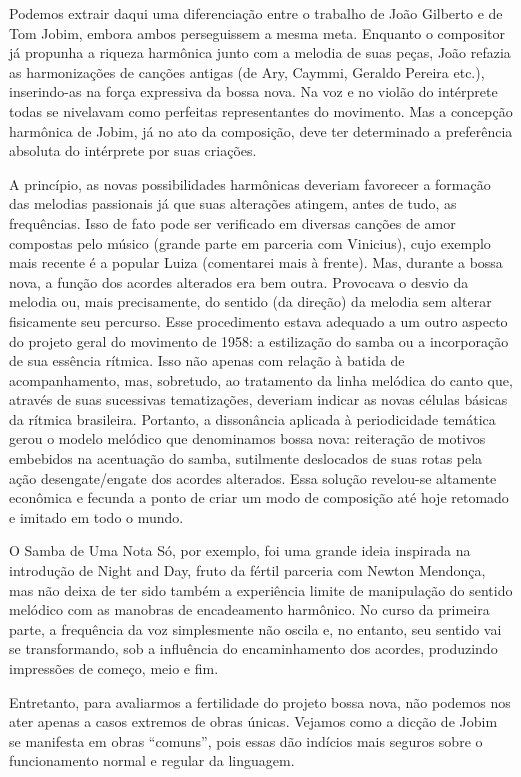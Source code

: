 Podemos extrair daqui uma diferenciação entre o trabalho de João
Gilberto e de Tom Jobim, embora ambos perseguissem a mesma meta.
Enquanto o compositor já propunha a riqueza harmônica junto com a
melodia de suas peças, João refazia as harmonizações de canções antigas
(de Ary, Caymmi, Geraldo Pereira etc.), inserindo-as na força expressiva
da bossa nova. Na voz e no violão do intérprete todas se nivelavam como
perfeitas representantes do movimento. Mas a concepção harmônica de
Jobim, já no ato da composição, deve ter determinado a preferência
absoluta do intérprete por suas criações.

A princípio, as novas possibilidades harmônicas deveriam favorecer a
formação das melodias passionais já que suas alterações atingem, antes
de tudo, as frequências. Isso de fato pode ser verificado em diversas
canções de amor compostas pelo músico (grande parte em parceria com
Vinicius), cujo exemplo mais recente é a popular Luiza (comentarei mais
à frente). Mas, durante a bossa nova, a função dos acordes alterados era
bem outra. Provocava o desvio da melodia ou, mais precisamente, do
sentido (da direção) da melodia sem alterar fisicamente seu percurso.
Esse procedimento estava adequado a um outro aspecto do projeto geral do
movimento de 1958: a estilização do samba ou a incorporação de sua
essência rítmica. Isso não apenas com relação à batida de
acompanhamento, mas, sobretudo, ao tratamento da linha melódica do canto
que, através de suas sucessivas tematizações, deveriam indicar as novas
células básicas da rítmica brasileira. Portanto, a dissonância aplicada
à periodicidade temática gerou o modelo melódico que denominamos bossa
nova: reiteração de motivos embebidos na acentuação do samba, sutilmente
deslocados de suas rotas pela ação desengate/engate dos acordes
alterados. Essa solução revelou-se altamente econômica e fecunda a ponto
de criar um modo de composição até hoje retomado e imitado em todo o
mundo.

O Samba de Uma Nota Só, por exemplo, foi uma grande ideia inspirada na
introdução de Night and Day, fruto da fértil parceria com Newton
Mendonça, mas não deixa de ter sido também a experiência limite de
manipulação do sentido melódico com as manobras de encadeamento
harmônico. No curso da primeira parte, a frequência da voz simplesmente
não oscila e, no entanto, seu sentido vai se transformando, sob a
influência do encaminhamento dos acordes, produzindo impressões de
começo, meio e fim.

Entretanto, para avaliarmos a fertilidade do projeto bossa nova, não
podemos nos ater apenas a casos extremos de obras únicas. Vejamos como a
dicção de Jobim se manifesta em obras ``comuns'', pois essas dão
indícios mais seguros sobre o funcionamento normal e regular da
linguagem.

